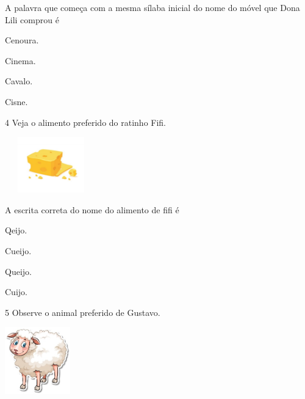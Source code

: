 
A palavra que começa com a mesma sílaba inicial do nome do móvel que Dona Lili comprou é

\begin{escolha}
\item Cenoura.

\item Cinema.

\item Cavalo.

\item Cisne.
\end{escolha}

\num{4} Veja o alimento preferido do ratinho Fifi.

\includegraphics[width=1.56736in,height=0.94861in]{media/image141.jpeg}


A escrita correta do nome do alimento de fifi é

\begin{escolha}
\item Qeijo.

\item Cueijo.

\item Queijo.

\item Cuijo.
\end{escolha}

\num{5} Observe o animal preferido de Gustavo.

\includegraphics[width=1.11458in,height=1.13889in]{media/image142.jpeg}

